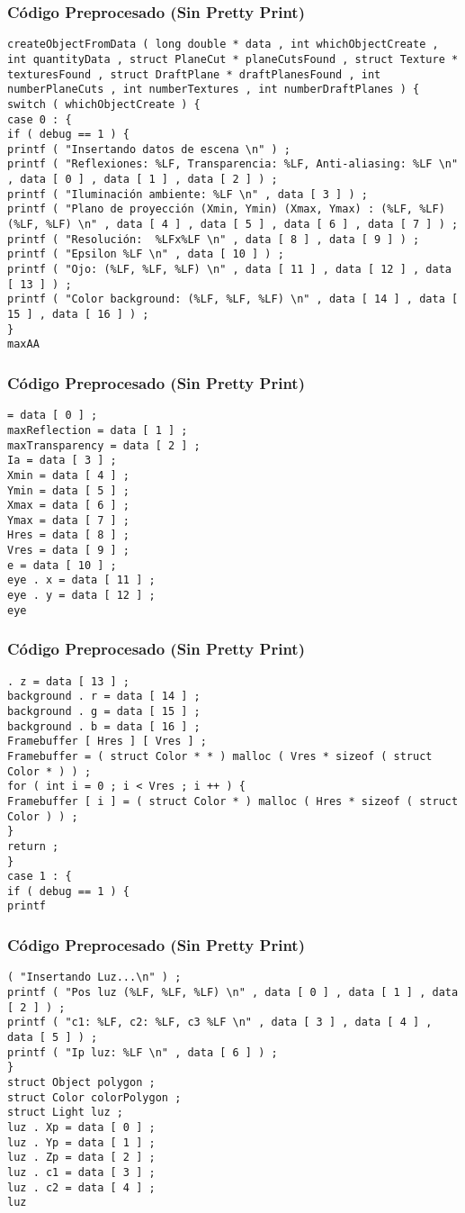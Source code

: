 \documentclass{beamer}
\begin{document}
\begin{frame}[fragile]
\frametitle{C\'odigo Preprocesado (Sin Pretty Print)}
\begin{lstlisting}[style=CStyle]
createObjectFromData ( long double * data , int whichObjectCreate , int quantityData , struct PlaneCut * planeCutsFound , struct Texture * texturesFound , struct DraftPlane * draftPlanesFound , int numberPlaneCuts , int numberTextures , int numberDraftPlanes ) { 
switch ( whichObjectCreate ) { 
case 0 : { 
if ( debug == 1 ) { 
printf ( "Insertando datos de escena \n" ) ; 
printf ( "Reflexiones: %LF, Transparencia: %LF, Anti-aliasing: %LF \n" , data [ 0 ] , data [ 1 ] , data [ 2 ] ) ; 
printf ( "Iluminación ambiente: %LF \n" , data [ 3 ] ) ; 
printf ( "Plano de proyección (Xmin, Ymin) (Xmax, Ymax) : (%LF, %LF) (%LF, %LF) \n" , data [ 4 ] , data [ 5 ] , data [ 6 ] , data [ 7 ] ) ; 
printf ( "Resolución:  %LFx%LF \n" , data [ 8 ] , data [ 9 ] ) ; 
printf ( "Epsilon %LF \n" , data [ 10 ] ) ; 
printf ( "Ojo: (%LF, %LF, %LF) \n" , data [ 11 ] , data [ 12 ] , data [ 13 ] ) ; 
printf ( "Color background: (%LF, %LF, %LF) \n" , data [ 14 ] , data [ 15 ] , data [ 16 ] ) ; 
} 
maxAA \end{lstlisting}
\end{frame}
\begin{frame}[fragile]
\frametitle{C\'odigo Preprocesado (Sin Pretty Print)}
\begin{lstlisting}[style=CStyle]
= data [ 0 ] ; 
maxReflection = data [ 1 ] ; 
maxTransparency = data [ 2 ] ; 
Ia = data [ 3 ] ; 
Xmin = data [ 4 ] ; 
Ymin = data [ 5 ] ; 
Xmax = data [ 6 ] ; 
Ymax = data [ 7 ] ; 
Hres = data [ 8 ] ; 
Vres = data [ 9 ] ; 
e = data [ 10 ] ; 
eye . x = data [ 11 ] ; 
eye . y = data [ 12 ] ; 
eye \end{lstlisting}
\end{frame}
\begin{frame}[fragile]
\frametitle{C\'odigo Preprocesado (Sin Pretty Print)}
\begin{lstlisting}[style=CStyle]
. z = data [ 13 ] ; 
background . r = data [ 14 ] ; 
background . g = data [ 15 ] ; 
background . b = data [ 16 ] ; 
Framebuffer [ Hres ] [ Vres ] ; 
Framebuffer = ( struct Color * * ) malloc ( Vres * sizeof ( struct Color * ) ) ; 
for ( int i = 0 ; i < Vres ; i ++ ) { 
Framebuffer [ i ] = ( struct Color * ) malloc ( Hres * sizeof ( struct Color ) ) ; 
} 
return ; 
} 
case 1 : { 
if ( debug == 1 ) { 
printf \end{lstlisting}
\end{frame}
\begin{frame}[fragile]
\frametitle{C\'odigo Preprocesado (Sin Pretty Print)}
\begin{lstlisting}[style=CStyle]
( "Insertando Luz...\n" ) ; 
printf ( "Pos luz (%LF, %LF, %LF) \n" , data [ 0 ] , data [ 1 ] , data [ 2 ] ) ; 
printf ( "c1: %LF, c2: %LF, c3 %LF \n" , data [ 3 ] , data [ 4 ] , data [ 5 ] ) ; 
printf ( "Ip luz: %LF \n" , data [ 6 ] ) ; 
} 
struct Object polygon ; 
struct Color colorPolygon ; 
struct Light luz ; 
luz . Xp = data [ 0 ] ; 
luz . Yp = data [ 1 ] ; 
luz . Zp = data [ 2 ] ; 
luz . c1 = data [ 3 ] ; 
luz . c2 = data [ 4 ] ; 
luz \end{lstlisting}
\end{frame}
\end{document}
